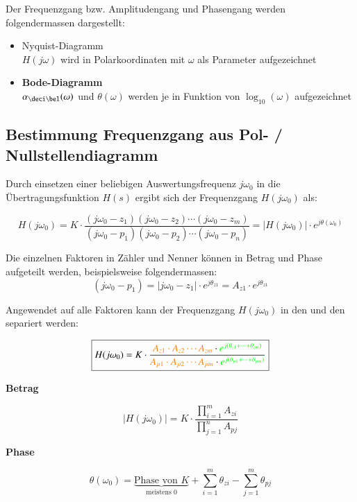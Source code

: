 Der Frequenzgang bzw. Amplitudengang und Phasengang werden folgendermassen dargestellt:

\begin{itemize}
    \item Nyquist-Diagramm \\
        $H(j \omega)$ wird in Polarkoordinaten mit $\omega$ als Parameter aufgezeichnet 
    \item \textbf{Bode-Diagramm} \\
        $\alpha_{\deci \bel}(\omega)$ und $\theta(\omega)$ werden je in Funktion von $\log_{10}(\omega)$ aufgezeichnet
\end{itemize}


\subsection{Bestimmung Frequenzgang aus Pol- / Nullstellendiagramm}

Durch einsetzen einer beliebigen Auswertungsfrequenz $j \omega_0$ in die Übertragungsfunktion $H(s)$ ergibt sich der
Frequenzgang $H(j \omega_0)$ als:

$$ H(j \omega_0) = K \cdot \frac{(j \omega_0 - z_1) (j \omega_0 - z_2) \cdots (j \omega_0 - z_m)}
                                {(j \omega_0 - p_1) (j \omega_0 - p_2) \cdots (j \omega_0 - p_n)}
                                = | H(j \omega_0) | \cdot e^{j \theta (\omega_0)} $$

Die einzelnen Faktoren in Zähler und Nenner können in Betrag und Phase aufgeteilt werden, beispielsweise folgendermassen:
$$ (j \omega_0 - p_1) = |j \omega_0 - z_1| \cdot e^{j \theta_{z1}} = A_{z1} \cdot e^{j \theta_{z1}} $$



Angewendet auf alle Faktoren kann der Frequenzgang $H(j \omega_0)$ in den  und den
 separiert werden:

$$ \boxed{ H(j \omega_0) = K \cdot \frac{{\color{orange}A_{z1} \cdot A_{z2} \cdots A_{zm}} \cdot {\color{green}e^{j(\theta_{z1} + \cdots + \theta_{zm})}}}
                                        {{\color{orange}A_{p1} \cdot A_{p2} \cdots A_{pm}} \cdot {\color{green}e^{j(\theta_{p1} + \cdots + \theta_{pm})}}} } $$

\vspace{0.2cm}
\begin{minipage}[t]{0.48\columnwidth}
    \begin{center}
        \textbf{Betrag}
    \end{center}
    \vspace{-0.2cm}
    $$ \boxed{ | H(j \omega_0) | = K \cdot \frac{\prod_{i=1}^{m} A_{zi}}{\prod_{j=1}^{n} A_{pj}} } $$
\end{minipage}
\hfill
\begin{minipage}[t]{0.48\columnwidth}
    \begin{center}
        \textbf{Phase}
    \end{center}
    \vspace{-0.2cm}
    $$ \boxed{ \theta(\omega_0) = \underbrace{\text{Phase von } K}_{\text{meistens } 0} + \sum_{i=1}^{m} \theta_{zi} - \sum_{j=1}^{m} \theta_{pj} } $$
\end{minipage}


